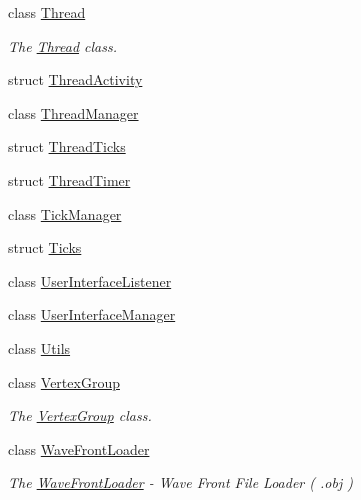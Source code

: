 \begin{DoxyCompactItemize}
class \hyperlink{classEngine_1_1Thread}{Thread}
\begin{DoxyCompactList}\small\item\em The \hyperlink{classEngine_1_1Thread}{Thread} class. \end{DoxyCompactList}\item 
struct \hyperlink{structEngine_1_1ThreadActivity}{Thread\+Activity}
\item 
class \hyperlink{classEngine_1_1ThreadManager}{Thread\+Manager}
\item 
struct \hyperlink{structEngine_1_1ThreadTicks}{Thread\+Ticks}
\item 
struct \hyperlink{structEngine_1_1ThreadTimer}{Thread\+Timer}
\item 
class \hyperlink{classEngine_1_1TickManager}{Tick\+Manager}
\item 
struct \hyperlink{structEngine_1_1Ticks}{Ticks}
\item 
class \hyperlink{classEngine_1_1UserInterfaceListener}{User\+Interface\+Listener}
\item 
class \hyperlink{classEngine_1_1UserInterfaceManager}{User\+Interface\+Manager}
\item 
class \hyperlink{classEngine_1_1Utils}{Utils}
\item 
class \hyperlink{classEngine_1_1VertexGroup}{Vertex\+Group}
\begin{DoxyCompactList}\small\item\em The \hyperlink{classEngine_1_1VertexGroup}{Vertex\+Group} class. \end{DoxyCompactList}\item 
class \hyperlink{classEngine_1_1WaveFrontLoader}{Wave\+Front\+Loader}
\begin{DoxyCompactList}\small\item\em The \hyperlink{classEngine_1_1WaveFrontLoader}{Wave\+Front\+Loader} -\/ Wave Front File Loader ( .obj ) \end{DoxyCompactList}\end{DoxyCompactItemize}
